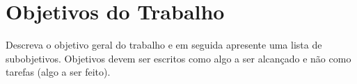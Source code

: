 
\section{Objetivos do Trabalho}
\label{sec-objetivos}

Descreva o objetivo geral do trabalho e em seguida apresente uma lista de subobjetivos. Objetivos devem ser escritos como algo a ser alcançado e não como tarefas (algo a ser feito).

